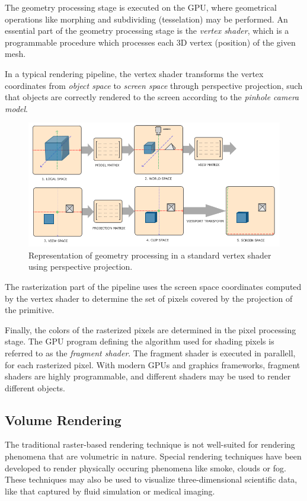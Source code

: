 \documentclass{article}
\begin{document}
The geometry processing stage is executed on the GPU, where geometrical operations like morphing and subdividing (tesselation) may be performed.
An essential part of the geometry processing stage is the \textit{vertex shader}, which is a programmable procedure which processes each 3D vertex (position) of the given mesh.

In a typical rendering pipeline, the vertex shader transforms the vertex coordinates from \textit{object space} to \textit{screen space} through perspective projection, such that
objects are correctly rendered to the screen according to the \textit{pinhole camera model}.

\begin{figure}[tbh]
    \centering
    \includegraphics[width=1.0\textwidth]{images/coordinate_systems.png}
    \caption{Representation of geometry processing in a standard vertex shader using perspective projection\cite{learnopengl_figure}.}
    \label{fig:graphicsTransformations}
\end{figure}

The rasterization part of the pipeline uses the screen space coordinates computed by the vertex shader to
determine the set of pixels covered by the projection of the primitive. 

Finally, the colors of the rasterized pixels are determined in the pixel processing stage.
The GPU program defining the algorithm used for shading pixels is referred to as the \textit{fragment shader}.
The fragment shader is executed in parallell, for each rasterized pixel. With modern GPUs and graphics frameworks, fragment shaders are highly programmable, and different shaders may be used to render different objects.

\newpage

\subsection{Volume Rendering}
The traditional raster-based rendering technique is not well-suited for rendering phenomena that are volumetric in nature.
Special rendering techniques have been developed to render physically occuring phenomena like smoke, clouds or fog. These techniques
may also be used to visualize three-dimensional scientific data, like that captured by fluid simulation or medical imaging.
\end{document}
